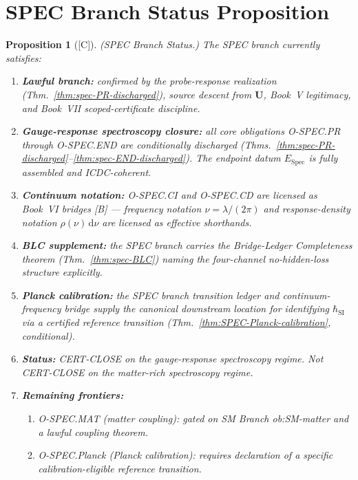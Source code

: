 \documentclass[12pt,oneside]{amsbook}
\theoremstyle{plain}
\newtheorem{proposition}[theorem]{Proposition}
\theoremstyle{definition}
\theoremstyle{remark}
\newcommand{\status}[1]{\textup{[#1]}}
\begin{document}
\section{SPEC Branch Status Proposition}\label{sec:spec-status}

\begin{proposition}[\status{C}]\label{prop:SPEC-status}
\textup{(SPEC Branch Status.)}
The SPEC branch currently satisfies:
\begin{enumerate}[label=\textup{(\arabic*)}]
 \item \textbf{Lawful branch:} confirmed by the probe-response
 realization (Thm.~\ref{thm:spec-PR-discharged}), source descent
 from $\mathbf{U}$, Book~V legitimacy, and Book~VII scoped-certificate
 discipline.
 \item \textbf{Gauge-response spectroscopy closure:} all core
 obligations O-SPEC.PR through O-SPEC.END are conditionally
 discharged (Thms.~\ref{thm:spec-PR-discharged}--\ref{thm:spec-END-discharged}).
 The endpoint datum $E_{\mathrm{Spec}}$ is fully assembled and ICDC-coherent.
 \item \textbf{Continuum notation:} O-SPEC.CI and O-SPEC.CD are
 licensed as Book~VI bridges [B] --- frequency notation
 $\nu=\lambda/(2\pi)$ and response-density notation
 $\rho(\nu)\,\mathrm{d}\nu$ are licensed as effective shorthands.
 \item \textbf{BLC supplement:} the SPEC branch carries the
 Bridge-Ledger Completeness theorem (Thm.~\ref{thm:spec-BLC})
 naming the four-channel no-hidden-loss structure explicitly.
 \item \textbf{Planck calibration:} the SPEC branch transition ledger
 and continuum-frequency bridge supply the canonical downstream
 location for identifying $\hbar_{\mathrm{SI}}$ via a certified
 reference transition (Thm.~\ref{thm:SPEC-Planck-calibration},
 conditional).
 \item \textbf{Status:} CERT-CLOSE on the gauge-response spectroscopy
 regime. Not CERT-CLOSE on the matter-rich spectroscopy regime.
 \item \textbf{Remaining frontiers:}
 \begin{enumerate}[label=\textup{(\alph*)}]
 \item O-SPEC.MAT (matter coupling): gated on SM Branch
 ob:SM-matter and a lawful coupling theorem.
 \item O-SPEC.Planck (Planck calibration): requires declaration
 of a specific calibration-eligible reference transition.
 \end{enumerate}
\end{enumerate}
\end{proposition}
\end{document}
